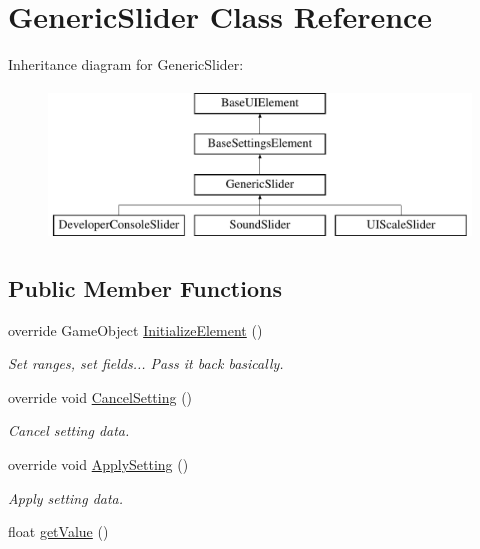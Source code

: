 \hypertarget{class_generic_slider}{}\section{Generic\+Slider Class Reference}
\label{class_generic_slider}
Inheritance diagram for Generic\+Slider\+:\begin{figure}[H]
\begin{center}
\leavevmode
\includegraphics[height=4.000000cm]{class_generic_slider}
\end{center}
\end{figure}
\subsection*{Public Member Functions}
\begin{DoxyCompactItemize}
\item 
override Game\+Object \hyperlink{class_generic_slider_afcfeee7d737e3cfc793739021a75e67c}{Initialize\+Element} ()
\begin{DoxyCompactList}\small\item\em Set ranges, set fields... Pass it back basically. \end{DoxyCompactList}\item 
override void \hyperlink{class_generic_slider_ab22180d2e9abdb678b9797956224651c}{Cancel\+Setting} ()
\begin{DoxyCompactList}\small\item\em Cancel setting data. \end{DoxyCompactList}\item 
override void \hyperlink{class_generic_slider_ae98915fdb0f94d37222e83e93f6ac814}{Apply\+Setting} ()
\begin{DoxyCompactList}\small\item\em Apply setting data. \end{DoxyCompactList}\item 
float \hyperlink{class_generic_slider_a2df1983d8a5f980c6a8c1bf1d25818b6}{get\+Value} ()
\end{DoxyCompactItemize}
